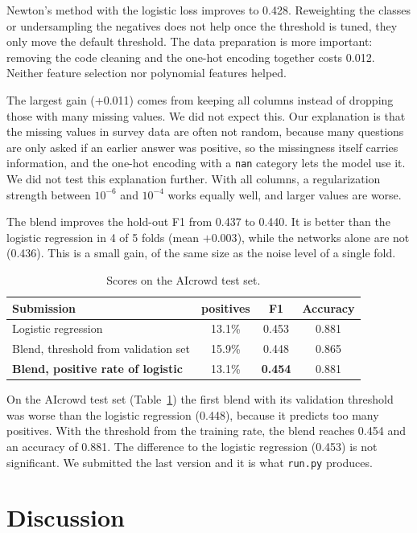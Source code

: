 \documentclass[10pt,conference,compsocconf]{IEEEtran}
\begin{document}
Newton's method with the logistic loss improves to 0.428. Reweighting the classes or undersampling the negatives does not help once the threshold is tuned, they only move the default threshold. The data preparation is more important: removing the code cleaning and the one-hot encoding together costs 0.012. Neither feature selection nor polynomial features helped.

The largest gain (+0.011) comes from keeping all columns instead of dropping those with many missing values. We did not expect this. Our explanation is that the missing values in survey data are often not random, because many questions are only asked if an earlier answer was positive, so the missingness itself carries information, and the one-hot encoding with a \texttt{nan} category lets the model use it. We did not test this explanation further. With all columns, a regularization strength between $10^{-6}$ and $10^{-4}$ works equally well, and larger values are worse.

The blend improves the hold-out F1 from 0.437 to 0.440. It is better than the logistic regression in 4 of 5 folds (mean $+0.003$), while the networks alone are not (0.436). This is a small gain, of the same size as the noise level of a single fold.

\begin{table}[tbp]
  \centering
  \footnotesize
  \begin{tabular}{@{}lccc@{}}
    \toprule
    Submission & positives & F1 & Accuracy \\
    \midrule
    Logistic regression & 13.1\% & 0.453 & 0.881 \\
    Blend, threshold from validation set & 15.9\% & 0.448 & 0.865 \\
    \textbf{Blend, positive rate of logistic} & 13.1\% & \textbf{0.454} & 0.881 \\
    \bottomrule
  \end{tabular}
  \caption{Scores on the AIcrowd test set.}
  \label{tab:test}
\end{table}

On the AIcrowd test set (Table~\ref{tab:test}) the first blend with its validation threshold was worse than the logistic regression (0.448), because it predicts too many positives. With the threshold from the training rate, the blend reaches 0.454 and an accuracy of 0.881. The difference to the logistic regression (0.453) is not significant. We submitted the last version and it is what \texttt{run.py} produces.

\section{Discussion}
\end{document}
